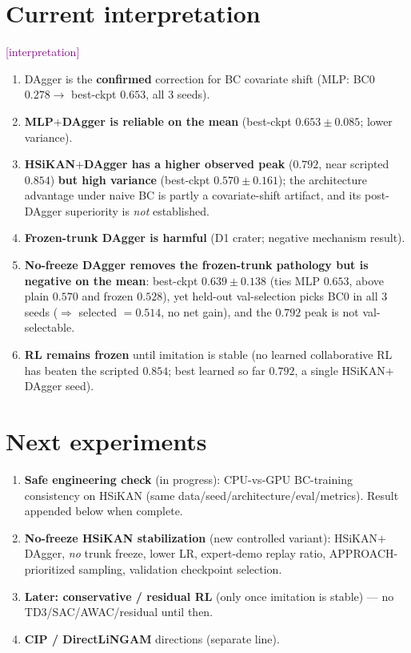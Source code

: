 \documentclass[11pt]{article}
\newcommand{\interp}{\textcolor{purple}{[interpretation]}}
\begin{document}
\section{Current interpretation}
\interp{}
\begin{enumerate}[nosep]
\item DAgger is the \textbf{confirmed} correction for BC covariate shift (MLP: BC0 $0.278\to$ best-ckpt $0.653$,
all 3 seeds).
\item \textbf{MLP$+$DAgger is reliable on the mean} (best-ckpt $0.653\pm0.085$; lower variance).
\item \textbf{HSiKAN$+$DAgger has a higher observed peak} ($0.792$, near scripted $0.854$) \textbf{but high
variance} (best-ckpt $0.570\pm0.161$); the architecture advantage under naive BC is partly a covariate-shift
artifact, and its post-DAgger superiority is \emph{not} established.
\item \textbf{Frozen-trunk DAgger is harmful} (D1 crater; negative mechanism result).
\item \textbf{No-freeze DAgger removes the frozen-trunk pathology but is negative on the mean}: best-ckpt
$0.639\pm0.138$ (ties MLP $0.653$, above plain $0.570$ and frozen $0.528$), yet held-out val-selection picks BC0 in
all 3 seeds ($\Rightarrow$ selected $=0.514$, no net gain), and the $0.792$ peak is not val-selectable.
\item \textbf{RL remains frozen} until imitation is stable (no learned collaborative RL has beaten the scripted
$0.854$; best learned so far $0.792$, a single HSiKAN$+$DAgger seed).
\end{enumerate}

\section{Next experiments}
\begin{enumerate}[nosep]
\item \textbf{Safe engineering check} (in progress): CPU-vs-GPU BC-training consistency on HSiKAN (same
data/seed/architecture/eval/metrics). Result appended below when complete.
\item \textbf{No-freeze HSiKAN stabilization} (new controlled variant): HSiKAN$+$DAgger, \emph{no} trunk freeze,
lower LR, expert-demo replay ratio, APPROACH-prioritized sampling, validation checkpoint selection.
\item \textbf{Later: conservative / residual RL} (only once imitation is stable) --- no TD3/SAC/AWAC/residual until
then.
\item \textbf{CIP / DirectLiNGAM} directions (separate line).
\end{enumerate}
\end{document}
